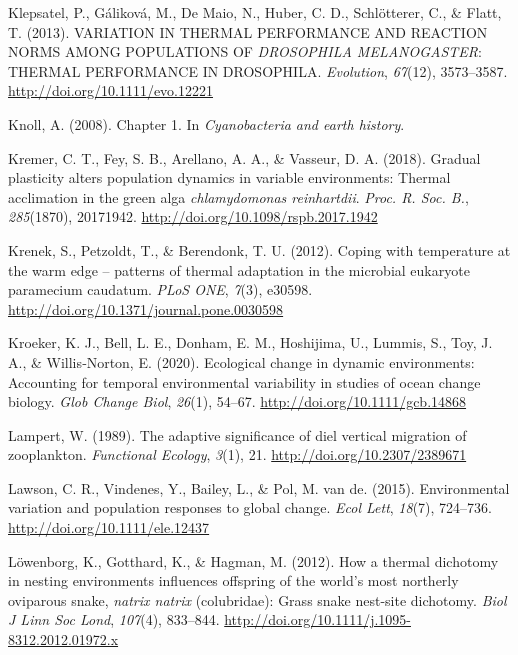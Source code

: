 \documentclass[12pt,twoside]{reedthesis}
\begin{document}
\leavevmode\hypertarget{ref-klepsatel_variation_2013}{}%
Klepsatel, P., Gáliková, M., De Maio, N., Huber, C. D., Schlötterer, C., \& Flatt, T. (2013). VARIATION IN THERMAL PERFORMANCE AND REACTION NORMS AMONG POPULATIONS OF \emph{DROSOPHILA MELANOGASTER}: THERMAL PERFORMANCE IN DROSOPHILA. \emph{Evolution}, \emph{67}(12), 3573--3587. \url{http://doi.org/10.1111/evo.12221}

\leavevmode\hypertarget{ref-knoll_chapter_2008}{}%
Knoll, A. (2008). Chapter 1. In \emph{Cyanobacteria and earth history}.

\leavevmode\hypertarget{ref-kremer_gradual_2018}{}%
Kremer, C. T., Fey, S. B., Arellano, A. A., \& Vasseur, D. A. (2018). Gradual plasticity alters population dynamics in variable environments: Thermal acclimation in the green alga \emph{chlamydomonas reinhartdii}. \emph{Proc. R. Soc. B.}, \emph{285}(1870), 20171942. \url{http://doi.org/10.1098/rspb.2017.1942}

\leavevmode\hypertarget{ref-krenek_coping_2012}{}%
Krenek, S., Petzoldt, T., \& Berendonk, T. U. (2012). Coping with temperature at the warm edge -- patterns of thermal adaptation in the microbial eukaryote paramecium caudatum. \emph{PLoS ONE}, \emph{7}(3), e30598. \url{http://doi.org/10.1371/journal.pone.0030598}

\leavevmode\hypertarget{ref-kroeker_ecological_2020}{}%
Kroeker, K. J., Bell, L. E., Donham, E. M., Hoshijima, U., Lummis, S., Toy, J. A., \& Willis‐Norton, E. (2020). Ecological change in dynamic environments: Accounting for temporal environmental variability in studies of ocean change biology. \emph{Glob Change Biol}, \emph{26}(1), 54--67. \url{http://doi.org/10.1111/gcb.14868}

\leavevmode\hypertarget{ref-lampert_adaptive_1989}{}%
Lampert, W. (1989). The adaptive significance of diel vertical migration of zooplankton. \emph{Functional Ecology}, \emph{3}(1), 21. \url{http://doi.org/10.2307/2389671}

\leavevmode\hypertarget{ref-lawson_environmental_2015}{}%
Lawson, C. R., Vindenes, Y., Bailey, L., \& Pol, M. van de. (2015). Environmental variation and population responses to global change. \emph{Ecol Lett}, \emph{18}(7), 724--736. \url{http://doi.org/10.1111/ele.12437}

\leavevmode\hypertarget{ref-lowenborg_how_2012}{}%
Löwenborg, K., Gotthard, K., \& Hagman, M. (2012). How a thermal dichotomy in nesting environments influences offspring of the world's most northerly oviparous snake, \emph{natrix natrix} (colubridae): Grass snake nest-site dichotomy. \emph{Biol J Linn Soc Lond}, \emph{107}(4), 833--844. \url{http://doi.org/10.1111/j.1095-8312.2012.01972.x}
\end{document}
